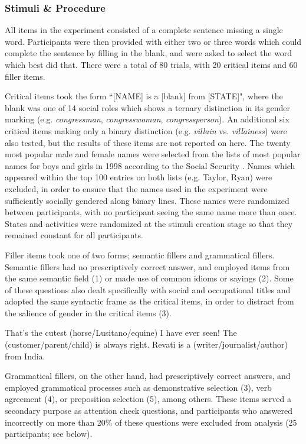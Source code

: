 \documentclass[10pt,letterpaper]{article}
\begin{document}
	\subsubsection{Stimuli \& Procedure} All items in the experiment consisted of a complete sentence missing a single word. Participants were then provided with either two or three words which could complete the sentence by filling in the blank, and were asked to select the word which best did that. There were a total of 80 trials, with 20 critical items and 60 filler items.\par 
	Critical items took the form ``[NAME] is a [blank] from [STATE]", where the blank was one of 14 social roles which shows a ternary distinction in its gender marking (e.g. \textit{congressman}, \textit{congresswoman}, \textit{congressperson}). An additional six critical items making only a binary distinction (e.g. \textit{villain} vs. \textit{villainess}) were also tested, but the results of these items are not reported on here. The twenty most popular male and female names were selected from the lists of most popular names for boys and girls in 1998 according to the Social Security \textcite{socialsecurity}. Names which appeared within the top 100 entries on both lists (e.g. Taylor, Ryan) were excluded, in order to ensure that the names used in the experiment were sufficiently socially gendered along binary lines. These names were randomized between participants, with no participant seeing the same name more than once. States and activities were randomized at the stimuli creation stage so that they remained constant for all participants.\par 
	Filler items took one of two forms; semantic fillers and grammatical fillers. Semantic fillers had no prescriptively correct answer, and employed items from the same semantic field (1) or made use of common idioms or sayings (2). Some of these questions also dealt specifically with social and occupational titles and adopted the same syntactic frame as the critical items, in order to distract from the salience of gender in the critical items (3). 
	
	\begin{exe}
		\ex That's the cutest (horse/Lusitano/equine) I have ever seen!
		\ex The (customer/parent/child) is always right.
		\ex Revati is a (writer/journalist/author) from India.
	\end{exe}

	Grammatical fillers, on the other hand, had prescriptively correct answers, and employed grammatical processes such as demonstrative selection (3), verb agreement (4), or preposition selection (5), among others. These items served a secondary purpose as attention check questions, and participants who answered incorrectly on more than 20\% of these questions were excluded from analysis (25 participants; see below).
	
\end{document}
